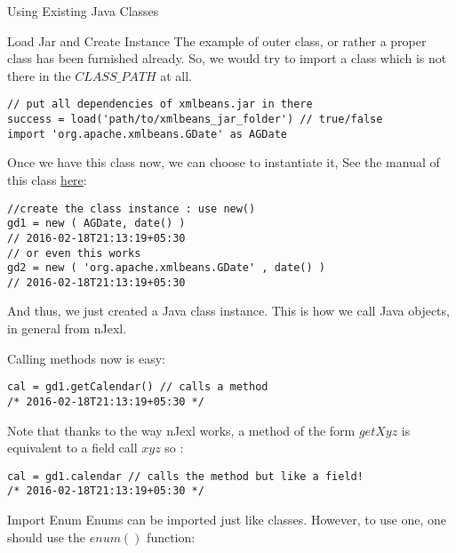 \begin{section}{Using Existing Java Classes}

\begin{subsection}{Load Jar and Create Instance}
The example of outer class, or rather a proper class 
has been furnished already. So, we would try to import a class
which is not there in the $CLASS\_PATH$ at all.

\begin{lstlisting}[style=JexlStyle]
// put all dependencies of xmlbeans.jar in there
success = load('path/to/xmlbeans_jar_folder') // true/false 
import 'org.apache.xmlbeans.GDate' as AGDate
\end{lstlisting}

Once we have this class now, we can choose to instantiate it,
See the manual of this class \href{https://xmlbeans.apache.org/docs/2.1.0/reference/org/apache/xmlbeans/GDate.html}{here}:

\begin{lstlisting}[style=JexlStyle]
//create the class instance : use new() 
gd1 = new ( AGDate, date() )
// 2016-02-18T21:13:19+05:30
// or even this works 
gd2 = new ( 'org.apache.xmlbeans.GDate' , date() )
// 2016-02-18T21:13:19+05:30
\end{lstlisting}

And thus, we just created a Java class instance.
This is how we call Java objects, in general from nJexl.

Calling methods now is easy:

\begin{lstlisting}[style=JexlStyle]
cal = gd1.getCalendar() // calls a method 
/* 2016-02-18T21:13:19+05:30 */
\end{lstlisting}

Note that thanks to the way nJexl works, a method of the form $getXyz$
is equivalent to a field call $xyz$ so :

\begin{lstlisting}[style=JexlStyle]
cal = gd1.calendar // calls the method but like a field! 
/* 2016-02-18T21:13:19+05:30 */
\end{lstlisting}

\end{subsection}


\begin{subsection}{Import Enum}
Enums can be imported just like classes.
However, to use one, one should use the $enum()$ function:


\end{subsection}
\end{section}
